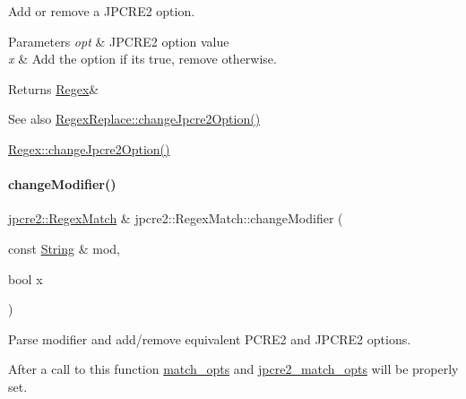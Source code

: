 Add or remove a J\+P\+C\+R\+E2 option. 


\begin{DoxyParams}{Parameters}
{\em opt} & J\+P\+C\+R\+E2 option value \\
\hline
{\em x} & Add the option if it\textquotesingle{}s true, remove otherwise. \\
\hline
\end{DoxyParams}
\begin{DoxyReturn}{Returns}
\hyperlink{classjpcre2_1_1Regex}{Regex}\& 
\end{DoxyReturn}
\begin{DoxySeeAlso}{See also}
\hyperlink{classjpcre2_1_1RegexReplace_afebf5e76bce8e312ab6dbdec3288b02b_afebf5e76bce8e312ab6dbdec3288b02b}{Regex\+Replace\+::change\+Jpcre2\+Option()} 

\hyperlink{classjpcre2_1_1Regex_ab8e0b1a49eeb1077ba54cf3b5292c95e_ab8e0b1a49eeb1077ba54cf3b5292c95e}{Regex\+::change\+Jpcre2\+Option()} 
\end{DoxySeeAlso}
\hypertarget{classjpcre2_1_1RegexMatch_a877be3123d789020d259939bc79e8cfe_a877be3123d789020d259939bc79e8cfe}{}\label{classjpcre2_1_1RegexMatch_a877be3123d789020d259939bc79e8cfe_a877be3123d789020d259939bc79e8cfe} 
\paragraph{\texorpdfstring{change\+Modifier()}{changeModifier()}}
{\footnotesize\ttfamily \hyperlink{classjpcre2_1_1RegexMatch}{jpcre2\+::\+Regex\+Match} \& jpcre2\+::\+Regex\+Match\+::change\+Modifier (\begin{DoxyParamCaption}\item[{const \hyperlink{namespacejpcre2_a91f03070152fb228bc116c5a737f1d16}{String} \&}]{mod,  }\item[{bool}]{x }\end{DoxyParamCaption})}



Parse modifier and add/remove equivalent P\+C\+R\+E2 and J\+P\+C\+R\+E2 options. 

After a call to this function \hyperlink{classjpcre2_1_1RegexMatch_a697d5731007350b0f20d2018fcfafa90}{match\+\_\+opts} and \hyperlink{classjpcre2_1_1RegexMatch_a70d62df887eeed237724f64fbc378700}{jpcre2\+\_\+match\+\_\+opts} will be properly set.

